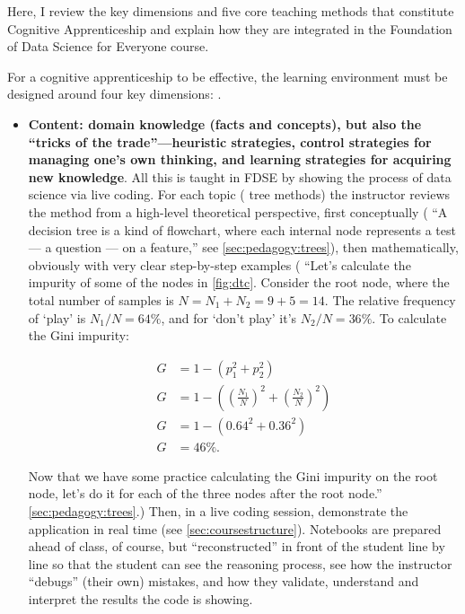 Here, I review the key dimensions and five core teaching methods that constitute Cognitive Apprenticeship and explain how they are integrated in the Foundation of Data Science for Everyone course.

For a cognitive apprenticeship to be effective, the learning environment must be designed around four key dimensions: \cite{collins2018cognitive}.

\begin{itemize}
    \item{\bf Content: domain knowledge (facts and concepts), but also the ``tricks of the trade''—heuristic strategies, control strategies for managing one's own thinking, and learning strategies for acquiring new knowledge}. All this is taught in FDSE by showing the process of data science via live coding. For each topic (\eg{} tree methods) the instructor reviews the method from a high-level theoretical perspective, first conceptually (\eg{} ``A decision tree is a kind of flowchart, where each internal node represents a test — a question — on a feature,'' see \autoref{sec:pedagogy:trees}), then mathematically, obviously with very clear step-by-step examples (\eg{} ``Let's calculate the impurity of some of the nodes in \autoref{fig:dtc}. Consider the root node, where the total number of samples is $N=N_1+N_2=9+5=14$. The relative frequency of `play' is $N_1/N=64\%$, and for `don't play' it's $N_2/N=36\%$. To calculate the Gini impurity:
    
    \begin{align*}
        G &= 1 - (p_1^2 + p_2^2) \\
        G &= 1 - \left( \left(\frac{N_1}{N}\right)^2 + \left(\frac{N_2}{N}\right)^2 \right) \\
        G &= 1 - \left( 0.64^2 + 0.36^2 \right) \\
        G &= 46\%.
    \end{align*} 
    
    Now that we have some practice calculating the Gini impurity on the root node, let’s do it for each of the three nodes after the root node.'' \autoref{sec:pedagogy:trees}.) Then, in a live coding session, demonstrate the application in real time (see \autoref{sec:coursestructure}). Notebooks are prepared ahead of class, of course, but ``reconstructed'' in front of the student line by line so that the student can see the reasoning process, see how the instructor ``debugs'' (their own) mistakes, and how they validate, understand and interpret the results the code is showing.
    

\end{itemize}
